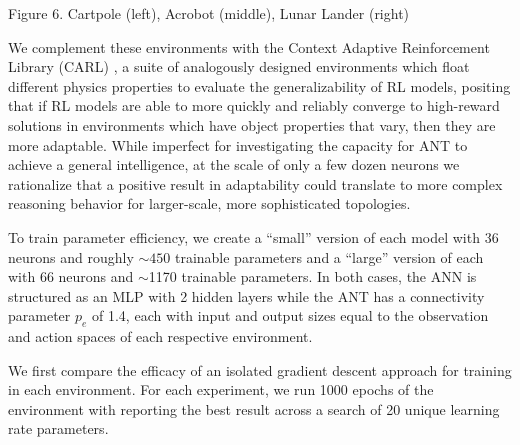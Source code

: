 \documentclass{article}
\begin{document}
\begin{multicols}{2}
\begin{center}
		\footnotesize Figure 6. Cartpole (left), Acrobot (middle), Lunar Lander (right)	
	\end{center}

	
	We complement these environments with the Context Adaptive Reinforcement Library (CARL) \cite{benjamins2023}, a suite of analogously designed environments which float different physics properties to evaluate the generalizability of RL models, positing that if RL models are able to more quickly and reliably converge to high-reward solutions in environments which have object properties that vary, then they are more adaptable. While imperfect for investigating the capacity for ANT to achieve a general intelligence, at the scale of only a few dozen neurons we rationalize that a positive result in adaptability could translate to more complex reasoning behavior for larger-scale, more sophisticated topologies.
	
	To train parameter efficiency, we create a ``small'' version of each model with 36 neurons and roughly $\sim450$ trainable parameters and a ``large'' version of each with 66 neurons and $\sim$1170 trainable parameters. In both cases, the ANN is structured as an MLP with 2 hidden layers while the ANT has a connectivity parameter $p_e$ of 1.4, each with input and output sizes equal to the observation and action spaces of each respective environment.
	
	We first compare the efficacy of an isolated gradient descent approach for training in each environment. For each experiment, we run 1000 epochs of the environment with reporting the best result across a search of 20 unique learning rate parameters.
	

\end{multicols}
\end{document}
